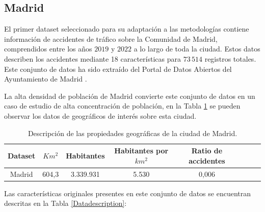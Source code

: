 \documentclass{uathesis-es}
\begin{document}
{\subsection*{Madrid}

El primer dataset seleccionado para su adaptación a las metodologías contiene información de accidentes de tráfico sobre la Comunidad de Madrid, comprendidos entre los años $2019$ y $2022$ a lo largo de toda la ciudad. Estos datos describen los accidentes mediante 18 características para $73\,514$ registros totales. Este conjunto de datos ha sido extraído del Portal de Datos Abiertos del Ayuntamiento de Madrid \cite{InfoDatasetMadrid}. 

La alta densidad de población de Madrid convierte este conjunto de datos en un caso de estudio de alta concentración de población, en la Tabla \ref{Madrid_statistics} se pueden observar los datos de geográficos de interés sobre esta ciudad.

\begin{table}[H]
	\begin{center}
		\begin{tabular}{|c|c||c|c|c|c|c|c|}
		\hline
		\textbf{Dataset} & \textbf{$Km^2$} & \textbf{Habitantes} & \textbf{Habitantes por $km^2$} & \textbf{Ratio de accidentes}
		\\ \hline \hline

        Madrid & 604,3 & 3.339.931 & 5.530 & 0,006 \\ \hline

		\end{tabular}
	\end{center}
	\caption{Descripción de las propiedades geográficas de la ciudad de Madrid.}
	\label{Madrid_statistics}
\end{table}

Las características originales presentes en este conjunto de datos se encuentran descritas en la Tabla \ref{Datadescription}:

}
\end{document}
